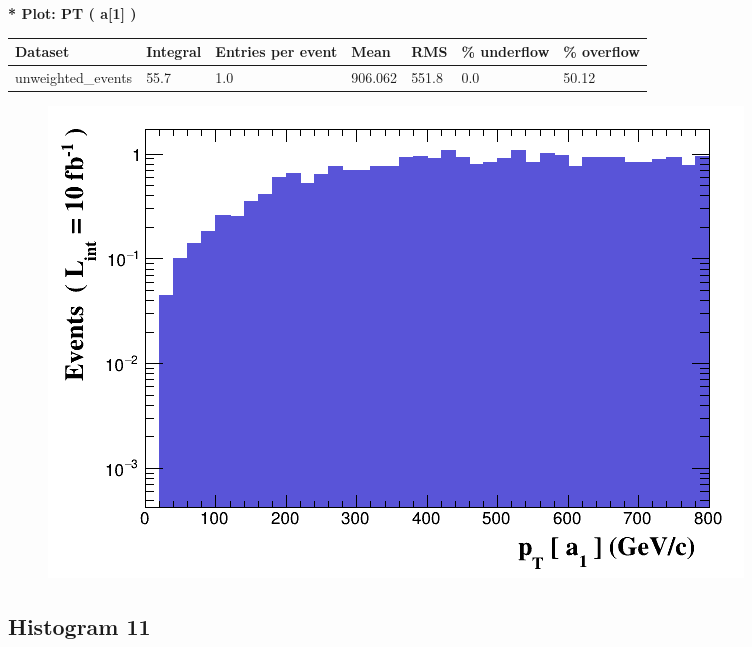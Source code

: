 \documentclass[a4paper, 10pt]{article}
\begin{document}
\textbf{* Plot: PT ( a[1] ) }\\
   \begin{table}[H]
  \begin{center}
    \begin{tabular}{|m{23.0mm}|m{23.0mm}|m{18.0mm}|m{19.0mm}|m{19.0mm}|m{19.0mm}|m{19.0mm}|}
      \hline
      {\cellcolor{yellow}         Dataset}& {\cellcolor{yellow}         Integral}& {\cellcolor{yellow}         Entries per event}& {\cellcolor{yellow}         Mean}& {\cellcolor{yellow}         RMS}& {\cellcolor{yellow}         \% underflow}& {\cellcolor{yellow}         \% overflow}\\
      \hline
      {\cellcolor{white}         unweighted\_events}& {\cellcolor{white}         55.7}& {\cellcolor{white}         1.0}& {\cellcolor{white}         906.062}& {\cellcolor{white}         551.8}& {\cellcolor{red}         0.0}& {\cellcolor{red}         50.12}\\
\hline
    \end{tabular}
  \end{center}
\end{table}

\begin{figure}[H]
  \begin{center}
    \includegraphics[scale=0.45]{selection_9.png}\\
\caption{   }
  \end{center}
\end{figure}
      \newpage
\subsection{ Histogram 11}
\end{document}
